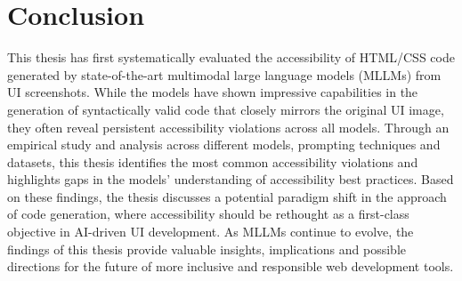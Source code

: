 \chapter{Conclusion}\label{chapter:Conclusion}
This thesis has first systematically evaluated the 
accessibility of HTML/CSS code generated by state-of-the-art 
multimodal large language models (MLLMs) from UI screenshots.
While the models have shown impressive capabilities in 
the generation of syntactically valid code that closely 
mirrors the original UI image, they often reveal 
persistent accessibility violations across all 
models. Through an empirical study and analysis across 
different models, prompting techniques and datasets, 
this thesis identifies the most common accessibility 
violations and highlights gaps in the models' 
understanding of accessibility best practices.\newline
Based on these findings, the thesis discusses a potential 
paradigm shift in the approach of code generation, 
where accessibility should be rethought as a 
first-class objective in AI-driven UI development. 
As MLLMs continue to evolve, the findings of this 
thesis provide valuable insights, implications and 
possible directions for the future of more inclusive 
and responsible web development tools.